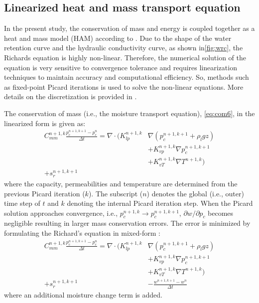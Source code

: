 \subsection{Linearized heat and mass transport equation}

In the present study, the conservation of mass and energy is coupled together as a heat and mass model (HAM) according to \citep{Janssen2002,Defraeye2011,Carmeliet2005,Saneinejad2013,Kubilay2018}. Due to the shape of the water retention curve and the hydraulic conductivity curve, as shown in\cref{fig:wrc}, the Richards equation is highly non-linear. Therefore, the numerical solution of the equation is very sensitive to convergence tolerance and requires linearization techniques to maintain accuracy and computational efficiency. So, methods such as fixed-point Picard iterations is used to solve the non-linear equations. More details on the discretization is provided in \cite{Liu2012,Janssen2002,Kubilay2018}. 

The conservation of mass (i.e., the moisture transport equation), \cref{eq:com6}, in the linearized form is given as:
\begin{equation}
\begin{split}
C^{n+1,k}_{\textit{mm}}\frac{p_c^{n+1,k+1}-p_c^{n}}{\Delta t} = \nabla \cdot \Big( K_{\textit{lp}}^{n+1,k} &\nabla \left(p_c^{n+1,k+1} + \rho_l g z\right)\\
&+ K_{\textit{vp}}^{n+1,k} \nabla p_c^{n+1,k+1} \\
&+ K_{vT}^{n+1,k} \nabla T^{n+1,k}\Big)\\
+ s_r^{n+1,k+1}&
\end{split}
\end{equation}
where the capacity, permeabilities and temperature are determined from the previous Picard iteration ($k$). The subscript ($n$) denotes the global (i.e., outer) time step of $t$ and $k$ denoting the internal Picard iteration step. When the Picard solution approaches convergence, i.e., $p_c^{n+1,k} \rightarrow p_c^{n+1,k+1}$, $\partial{w}/\partial p_c$ becomes negligible resulting in larger mass conservation errors. The error is minimized by formulating the Richard's equation in mixed-form \citep{Liu2012}:
\begin{equation}
\begin{split}
C^{n+1,k}_{\textit{mm}}\frac{p_c^{n+1,k+1}-p_c^{n}}{\Delta t} = \nabla \cdot \Big( K_{\textit{lp}}^{n+1,k} &\nabla \left(p_c^{n+1,k+1} + \rho_l g z\right)\\
&+ K_{\textit{vp}}^{n+1,k} \nabla p_c^{n+1,k+1} \\
&+ K_{vT}^{n+1,k} \nabla T^{n+1,k}\Big)\\
+ s_r^{n+1,k+1} &- \frac{w^{n+1,k+1}-w^n}{\Delta t}
\end{split}
\end{equation}
where an additional moisture change term is added.

